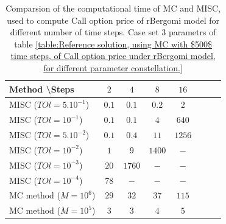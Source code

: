 \documentclass[11pt]{article}
\begin{document}
\begin{table}[h!]
	\centering
	\begin{tabular}{l*{6}{c}r}
		Method \textbackslash  Steps            & $2$ & $4$ & $8$ & $16$ &   \\
		\hline
		MISC ($TOl=5.10^{-1}$)  & $0.1$ & $0.1$ & $0.2$ & $2$  \\
		MISC ($TOl=10^{-1}$)  & $0.1$ & $0.1$ & $4$ & $640$  \\
		MISC ($TOl=5.10^{-2}$)  & $0.1$ & $0.4$ & $11$ & $1256$  \\
		MISC ($TOl=10^{-2}$)  & $1$ & $9$ & $1400$ & $-$  \\
		MISC ($TOl=10^{-3}$)  & $20$ & $1760$ & $-$ & $-$  \\
		MISC ($TOl=10^{-4}$)  & $78$ & $-$ & $-$ & $-$  \\
		\hline
		MC method ($M=10^6$)   & $29$  & $32$  & $37$ & $115$  \\	
		
		MC method ($M=10^5$)   & $3$  & $3$  & $4$ & $5$  \\
		\hline
	\end{tabular}
	\caption{Comparsion of the computational time of  MC and MISC, used to compute Call option price of rBergomi model for different number of time steps. Case set $3$ parametrs of table \ref{table:Reference solution, using MC with $500$ time steps, of Call option price under rBergomi model, for different parameter constellation.} }
	\label{Comparsion of the computational time of  MC and MISC, used to compute Call option price of rBergomi model for different number of time steps. Case set3}
\end{table}
\end{document}
